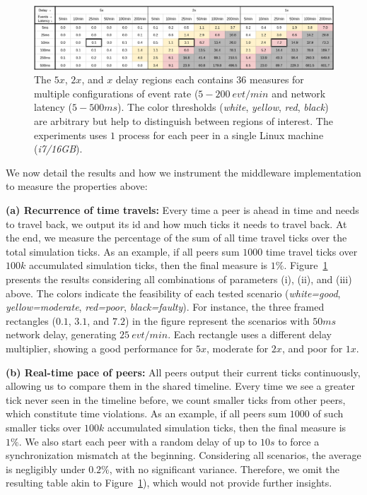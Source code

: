 \documentclass[fleqn,10pt]{SelfArx}
\begin{document}
\begin{figure}
  \centering
  \includegraphics[width=\linewidth]{baks}
  \caption{
    \label{fig.baks}
The $5x$, $2x$, and $x$ delay regions each contains $36$ measures for multiple
configurations of event rate ($5-200~evt/min$ and network latency ($5-500ms$).
%
The color thresholds (\emph{white}, \emph{yellow}, \emph{red}, \emph{black})
are arbitrary but help to distinguish between regions of interest.
%
The experiments uses $1$ process for each peer in a single Linux machine
(\emph{i7/16GB}).
    }
\end{figure}

We now detail the results and how we instrument the middleware implementation
to measure the properties above:

\textbf{(a) Recurrence of time travels:}
Every time a peer is ahead in time and needs to travel back, we output its id
and how much ticks it needs to travel back.
At the end, we measure the percentage of the sum of all time travel ticks over
the total simulation ticks.
As an example, if all peers sum $1000$ time travel ticks over $100k$
accumulated simulation ticks, then the final measure is $1\%$.
%
Figure~\ref{fig.baks} presents the results considering all combinations of
parameters (i), (ii), and (iii) above.
The colors indicate the feasibility of each tested scenario
    (\emph{white=good}, \emph{yellow=moderate}, \emph{red=poor},
    \emph{black=faulty}).
%
For instance, the three framed rectangles ($0.1$, $3.1$, and $7.2$) in the
figure represent the scenarios with $50ms$ network delay, generating
$25~evt/min$.
Each rectangle uses a different delay multiplier, showing a good performance
for $5x$, moderate for $2x$, and poor for $1x$.

\textbf{(b) Real-time pace of peers:}
All peers output their current ticks continuously, allowing us to compare them
in the shared timeline.
Every time we see a greater tick never seen in the timeline before, we count
smaller ticks from other peers, which constitute time violations.
As an example, if all peers sum $1000$ of such smaller ticks over $100k$
accumulated simulation ticks, then the final measure is $1\%$.
%
We also start each peer with a random delay of up to $10s$ to force a
synchronization mismatch at the beginning.
%
Considering all scenarios, the average is negligibly under $0.2\%$, with no
significant variance.
Therefore, we omit the resulting table akin to Figure~\ref{fig.baks}), which
would not provide further insights.
\end{document}
